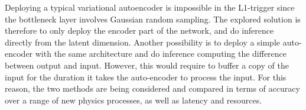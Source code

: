 Deploying a typical variational autoencoder is impossible in the L1-trigger since the bottleneck layer involves Gaussian random sampling. The explored solution is therefore to only deploy the encoder part of the network, and do inference directly from the latent dimension. Another possibility is to deploy a simple auto-encoder with the same architecture and do inference computing the difference between output and input. However, this would require to buffer a copy of the input for the duration it takes the auto-encoder to process the input.
For this reason, the two methods are being considered and compared in terms of accuracy over a range of new physics processes, as well as latency and resources.

